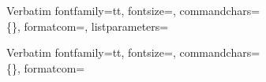 \newif\ifpdf
\ifx\pdfoutput\undefined
        \pdffalse
\else
        \pdftrue
\fi

\ifpdf
        \usepackage[final,pdftex]{graphicx}

\else
        \usepackage[final]{graphicx}
	\DeclareGraphicsExtensions{.eps}

\fi
\graphicspath{{../figures/}}

\iftwoside
  \textwidth5.97in
\else
  \textwidth5.98in
\fi



\setlength{\topmargin}{0in}
\setlength{\textheight}{8.5in}

%
  {Verbatim}%
  {fontfamily=tt,%
   fontsize=\small,%
   commandchars=\\\{\},%
   formatcom=\def\{{\symbol{123}}\def\}{\symbol{125}}\def\\{\symbol{92}},%
   listparameters=\setlength{\topsep}{0pt}%
                  \setlength{\partopsep}{0pt}%
                  \setlength{\parskip}{0pt}%
   }

%
  {Verbatim}%
  {fontfamily=tt,%
   fontsize=\small,%
   commandchars=\\\{\},%
   formatcom=\def\{{\symbol{123}}\def\}{\symbol{125}}\def\\{\symbol{92}}%
   }

\newcommand{\fancyfloatrule}{\ifwww\else{\noindent\hrulefill\par}\fi}
\newcommand{\fancyfloatsize}{\small}

\newenvironment{fancyfigure}[1][tbp]%
  {\begin{figure}[#1]%
   \fancyfloatsize%
   \fancyfloatrule%
  }
  {\fancyfloatrule%
   \end{figure}}

